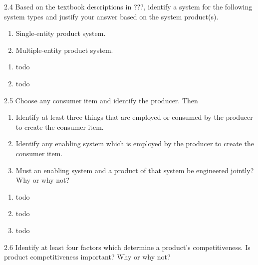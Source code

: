 \begin{exsol@exercise}{2.4}
    \label{sea-2-5_6}
        Based on the textbook descriptions in ???, identify a system for the following system types and justify your answer based on the system product(s).
        \begin{enumerate}[label=\alph*)]
            \item Single-entity product system.
            \item Multiple-entity product system.
        \end{enumerate}
\end{exsol@exercise}
\begin{exsol@solution}{}
        \begin{enumerate}[label=\alph*)]
            \item todo
            \item todo
        \end{enumerate}
\end{exsol@solution}
\begin{exsol@exercise}{2.5}
    \label{sea-2-7_8}
        Choose any consumer item and identify the producer. Then
        \begin{enumerate}[label=\alph*)]
            \item Identify at least three things that are employed or consumed by the producer to create the consumer item.
            \item Identify any enabling system which is employed by the producer to create the consumer item.
            \item Must an enabling system and a product of that system be engineered jointly? Why or why not?
        \end{enumerate}
\end{exsol@exercise}
\begin{exsol@solution}{}
        \begin{enumerate}[label=\alph*)]
            \item todo
            \item todo
            \item todo
        \end{enumerate}
\end{exsol@solution}
\begin{exsol@exercise}{2.6}
    \label{sea-2-9}
        Identify at least four factors which determine a product's competitiveness. Is product competitiveness important? Why or why not?
\end{exsol@exercise}
